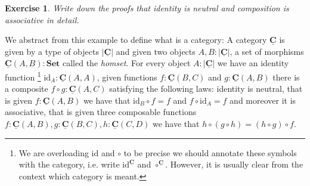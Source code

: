 \documentclass{article}
\newcommand{\Set}{\mathbf{Set}}
\newcommand{\cat}[1]{\underline{\mathbf{#1}}}
\newcommand{\obj}[1]{|#1|}
\newcommand{\homC}[3]{\cat{#1}(#2,#3)}
\newcommand{\id}{\mathrm{id}}
\newtheorem{exercise}{Exercise}
\begin{document}
\begin{exercise}
  Write down the proofs that identity is neutral and composition is associative in detail.
\end{exercise}

We abstract from this example to define what is a category: A category $\cat{C}$ is given by a type of objects $\obj{\cat{C}}$ and given two objects $A,B: \obj{\cat{C}}$, a set of morphisms $\homC{C}{A}{B} : \Set$ called the \emph{homset}. 
For every object $A : \obj{\cat{C}}$ we have an identity function%
\footnote{We are overloading $\id$ and $\circ$ to be precise we should annotate these symbols with the category, i.e. write $\id^{\cat{C}}$ and $\circ^{\cat{C}}$. However, it is usually clear from the context which category is meant.}
$\id_A : \homC{C}{A}{A}$, given functions $f : \homC{C}{B}{C}$ and $g : \homC{C}{A}{B}$ there is a composite $f \circ g : \homC{C}{A}{C}$ satisfying the following laws: identity is neutral, that is given $f : \cat{C}(A,B)$ we have that $\id_B \circ f = f$ and $f \circ \id_A = f$ and moreover it is associative, that is given three composable functions $f : \homC{C}{A}{B}, g : \homC{C}{B}{C}, h : \homC{C}{C}{D}$ we have that $h \circ (g \circ h) = (h \circ g) \circ f$.
\end{document}
